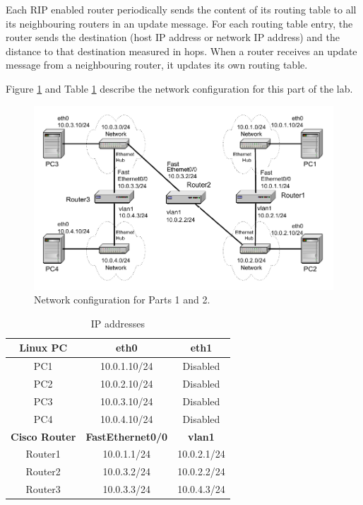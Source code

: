 Each RIP enabled router periodically sends the content of its routing table to all its neighbouring routers in an update message. For each routing table entry, the router sends the destination (host IP address or network IP address) and the distance to that destination measured in hops. When a router receives an update message from a neighbouring router, it updates its own routing table.

Figure \ref{fig:lab4-network1} and Table \ref{tab:lab4-network1} describe the network configuration for this part of the lab.

\begin{figure}[ht]
	\centering
	\includegraphics[width=\linewidth]{graphics/lab4-network1-updated.pdf}	
	\caption{Network configuration for Parts 1 and 2.}
	\label{fig:lab4-network1}
\end{figure}

\begin{table}[h!t]
	\centering
	\begin{tabular}{| c | c | c |}	
		\hline
		\textbf{Linux PC} & \textbf{eth0} & \textbf{eth1} \\ \hline
		PC1 & 10.0.1.10/24 & Disabled \\ 
		PC2 & 10.0.2.10/24 & Disabled \\
		PC3 & 10.0.3.10/24 & Disabled \\
		PC4 & 10.0.4.10/24 & Disabled \\ \hline
		\textbf{Cisco Router} & \textbf{FastEthernet0/0} & \textbf{vlan1} \\ \hline
		Router1 & 10.0.1.1/24 & 10.0.2.1/24 \\
		Router2 & 10.0.3.2/24 & 10.0.2.2/24 \\
		Router3 & 10.0.3.3/24 & 10.0.4.3/24 \\ \hline
	\end{tabular}
	\caption{IP addresses}
	\label{tab:lab4-network1}
\end{table}

